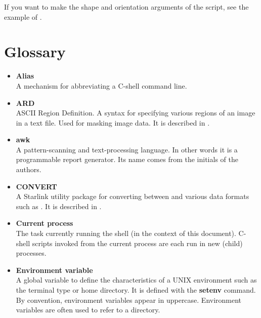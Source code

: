 If you want to make the shape and orientation arguments of the script,
see the example of 
.

\newpage
\section{Glossary\label{sc4_sc:glossary}}

\begin{itemize}

\item {\bf\label{sc4_gl_alias}Alias}\\
      A mechanism for abbreviating a C-shell command line.

\item {\bf\label{sc4_gl_ard}ARD}\\
      ASCII Region Definition.  A syntax for specifying various
      regions of an image in a text file.  Used for masking image data.
      It is described in .

\item {\bf\label{sc4_gl_awk}awk}\\
      A pattern-scanning and text-processing language.  In other words
      it is a programmable report generator.  Its name comes from the
      initials of the authors.

\item {\bf\label{sc4_gl_convert}CONVERT}\\
      A Starlink utility package for converting between
       and various data formats such as
      .  It is described in
      .

\item {\bf\label{sc4_gl_cur}Current process}\\
      The task currently running the shell (in the context of this
      document).  C-shell scripts invoked from the current process
      are each run in new (child) processes. 

\item {\bf\label{sc4_gl_env}Environment variable}\\
      A global variable to define the characteristics of a UNIX
      environment such as the terminal type or home directory.  It is
      defined with the {\bf setenv} command.  By convention, environment
      variables appear in uppercase.  Environment variables are often
      used to refer to a directory.


\end{itemize}
